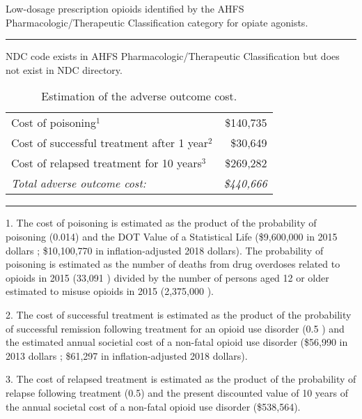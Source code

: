 \documentclass[9pt,twoside]{pnas-new}
\begin{document}
\begin{table}
\caption{Low-dosage prescription opioids identified by the AHFS Pharmacologic/Therapeutic Classification category for opiate agonists.}
\centering
\footnotesize

\hrule
\begin{tablenotes}
\footnotesize
\item * NDC code exists in AHFS Pharmacologic/Therapeutic Classification but does not exist in NDC directory.
\end{tablenotes}
\end{table}

\begin{table}
\caption{Estimation of the adverse outcome cost.}
\centering
\begin{tabular}{lr}
Cost of poisoning$^1$ & \$140,735 \\
Cost of successful treatment after 1 year$^2$ & \$30,649 \\
Cost of relapsed treatment for 10 years$^3$ & \$269,282 \\
\hline
\em Total adverse outcome cost: & \em \$440,666 \\[1em]
\end{tabular}
\hrule
\begin{tablenotes}
\footnotesize
\item 1. The cost of poisoning is estimated as the product of the probability of poisoning (0.014) and the DOT Value of a Statistical Life (\$9,600,000 in 2015 dollars \cite{vsl}; \$10,100,770 in inflation-adjusted 2018 dollars). The probability of poisoning is estimated as the number of deaths from drug overdoses related to opioids in 2015 (33,091 \cite{nida1}) divided by the number of persons aged 12 or older estimated to misuse opioids in 2015 (2,375,000 \cite{nida2}).
\item 2. The cost of successful treatment is estimated as the product of the probability of successful remission following treatment for an opioid use disorder (0.5 \cite{weiss}) and the estimated annual societial cost of a non-fatal opioid use disorder (\$56,990 in 2013 dollars \cite{florence}; \$61,297 in inflation-adjusted 2018 dollars).
\item 3. The cost of relapsed treatment is estimated as the product of the probability of relapse following treatment (0.5) and the present discounted value of 10 years of the annual societal cost of a non-fatal opioid use disorder (\$538,564).
\end{tablenotes}
\end{table}
\end{document}
